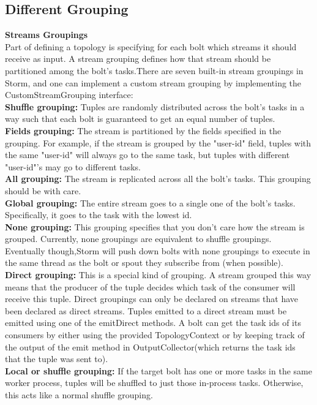 \subsection{Different Grouping}
{\bfseries Streams Groupings}\\[2mm]
Part of defining a topology is specifying for each bolt which streams it should receive as input. A stream grouping defines how that stream should be partitioned among the bolt's tasks.There are seven built-in stream groupings in Storm, and one can implement a custom stream grouping by implementing the  CustomStreamGrouping  interface:\\[2mm]
{\bfseries Shuffle grouping:} Tuples are randomly distributed across the bolt's tasks in a way such that each bolt is guaranteed to get an equal number of tuples.\\[2mm]
{\bfseries Fields grouping:} The stream is partitioned by the fields specified in the grouping. For example, if the stream is grouped by the "user-id" field, tuples with the same "user-id" will always go to the same task, but tuples with different "user-id"'s may go to different tasks.\\[2mm]
{\bfseries All grouping:} The stream is replicated across all the bolt's tasks. This grouping should be with care.\\[2mm]
{\bfseries Global grouping:} The entire stream goes to a single one of the bolt's tasks. Specifically, it goes to the task with the lowest id.\\[2mm]
{\bfseries None grouping:} This grouping specifies that you don't care how the stream is grouped. Currently, none groupings are equivalent to shuffle groupings. Eventually though,Storm will push down bolts with none groupings to execute in the same thread as the bolt or spout they subscribe from (when possible).\\[2mm]
{\bfseries Direct grouping:} This is a special kind of grouping. A stream grouped this way means that the producer of the tuple decides which task of the consumer will receive this tuple. Direct groupings can only be declared on streams that have been declared as direct streams. Tuples emitted to a direct stream must be emitted using one of the emitDirect methods. A bolt can get the task ids of its consumers by either using the provided TopologyContext or by keeping track of the output of the emit method in OutputCollector(which returns the task ids that the tuple was sent to).\\[2mm]
{\bfseries Local or shuffle grouping:} If the target bolt has one or more tasks in the same worker process, tuples will be shuffled to just those in-process tasks. Otherwise, this acts like a normal shuffle grouping.\\[2mm]

